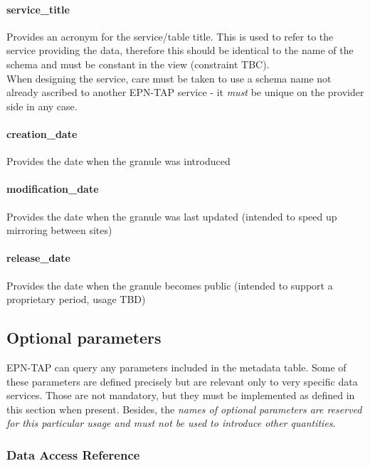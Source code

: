 \documentclass[11pt,a4paper]{ivoa}
\begin{document}
\paragraph{service\_title}

Provides an acronym for the service/table title. This is used to refer to the service providing the data, therefore this should be identical to the name of the schema and must be constant in the view (constraint TBC).\\When designing the service, care must be taken to use a schema name not already ascribed to another EPN-TAP service - it \emph{must} be unique on the provider side in any case.

\paragraph{creation\_date}

Provides the date when the granule was introduced

\paragraph{modification\_date}

Provides the date when the granule was last updated (intended to speed up mirroring between sites)

\paragraph{release\_date}

Provides the date when the granule becomes public (intended to support a proprietary period, usage TBD)

\subsection{Optional parameters}

EPN-TAP can query any parameters included in the metadata table. Some of these parameters are defined precisely but are relevant only to very specific data services. Those are not mandatory, but they must be implemented as defined in this section when present. Besides, the\emph{ names of optional parameters are reserved for this particular usage and must not be used to introduce other quantities}. 

\subsubsection{Data Access Reference}
\end{document}
